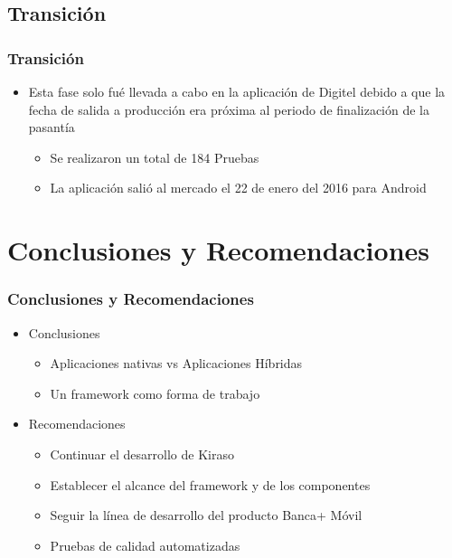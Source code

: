 \documentclass{beamer}
\begin{document}


\subsection{Transición}

\begin{frame}[fragile]
\frametitle{Transición}
\begin{itemize}
	\item Esta fase solo fué llevada a cabo en la aplicación de Digitel debido a que la fecha de salida a producción era próxima al periodo de finalización de la pasantía
	\begin{itemize}
		\item Se realizaron un total de 184 Pruebas
		\item La aplicación salió al mercado el 22 de enero del 2016 para Android
	\end{itemize}
\end{itemize}

\end{frame}


\section{Conclusiones y Recomendaciones}

\begin{frame}[fragile]
\frametitle{Conclusiones y Recomendaciones}
\begin{itemize}
\item Conclusiones
	\begin{itemize}
		\item Aplicaciones nativas vs Aplicaciones Híbridas
		\item Un framework como forma de trabajo
	\end{itemize}
\item Recomendaciones
	\begin{itemize}
		\item Continuar el desarrollo de Kiraso
		\item Establecer el alcance del framework y de los componentes
		\item Seguir la línea de desarrollo del producto Banca+ Móvil
		\item Pruebas de calidad automatizadas
	\end{itemize}
\end{itemize}
\end{frame}
\end{document}
